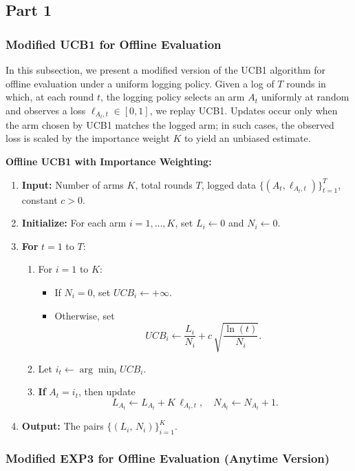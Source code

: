 \subsection{Part 1}

\subsubsection*{Modified UCB1 for Offline Evaluation}

In this subsection, we present a modified version of the UCB1 algorithm for offline evaluation under a uniform logging policy. Given a log of $T$ rounds in which, at each round $t$, the logging policy selects an arm $A_t$ uniformly at random and observes a loss $\ell_{A_t,t}\in[0,1]$, we replay UCB1. Updates occur only when the arm chosen by UCB1 matches the logged arm; in such cases, the observed loss is scaled by the importance weight $K$ to yield an unbiased estimate.

\textbf{Offline UCB1 with Importance Weighting:}
\begin{enumerate}
  \item \textbf{Input:} Number of arms $K$, total rounds $T$, logged data $\{(A_t,\ell_{A_t,t})\}_{t=1}^T$, constant $c>0$.
  \item \textbf{Initialize:} For each arm $i=1,\dots,K$, set $L_i \leftarrow 0$ and $N_i \leftarrow 0$.
  \item \textbf{For} $t = 1$ to $T$:
    \begin{enumerate}
      \item For $i = 1$ to $K$:
        \begin{itemize}
          \item If $N_i = 0$, set $UCB_i \leftarrow +\infty$.
          \item Otherwise, set 
          \[
            UCB_i \leftarrow \frac{L_i}{N_i} + c\,\sqrt{\frac{\ln(t)}{N_i}}.
          \]
        \end{itemize}
      \item Let $i_t \leftarrow \arg\min_{i} UCB_i$.
      \item \textbf{If} $A_t = i_t$, then update
      \[
        L_{A_t} \leftarrow L_{A_t} + K\,\ell_{A_t,t}, \quad N_{A_t} \leftarrow N_{A_t} + 1.
      \]
    \end{enumerate}
  \item \textbf{Output:} The pairs $\{(L_i,\,N_i)\}_{i=1}^K$.
\end{enumerate}

\subsubsection*{Modified EXP3 for Offline Evaluation (Anytime Version)}

